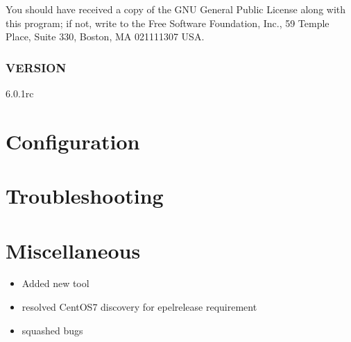 \documentclass[letterpaper,10pt,english]{sphinxmanual}
\begin{document}
\sphinxAtStartPar
You should have received a copy of the GNU General Public License along with
this program; if not, write to the Free Software Foundation, Inc., 59 Temple
Place, Suite 330, Boston, MA  02111\sphinxhyphen{}1307  USA.


\section{VERSION}
\label{\detokenize{mariadb-system-summary:version}}
\sphinxAtStartPar
{} 6.0.1rc


\part{Configuration}
\label{\detokenize{index:configuration}}

\part{Troubleshooting}
\label{\detokenize{index:troubleshooting}}

\part{Miscellaneous}
\label{\detokenize{index:miscellaneous}}\begin{itemize}
\item {} 
\sphinxAtStartPar
Added new tool

\item {} 
\sphinxAtStartPar
resolved CentOS7 discovery for epel\sphinxhyphen{}release requirement

\item {} 
\sphinxAtStartPar
squashed bugs

\end{itemize}



\renewcommand{\indexname}{Index}
\printindex
\end{document}
